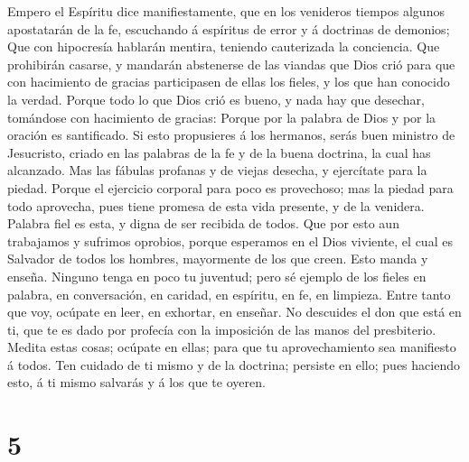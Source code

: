  Empero el Espíritu dice manifiestamente, que en los
venideros tiempos algunos apostatarán de la fe, escuchando á espíritus
de error y á doctrinas de demonios;  Que con hipocresía
hablarán mentira, teniendo cauterizada la conciencia.  Que
prohibirán casarse, y mandarán abstenerse de las viandas que Dios crió
para que con hacimiento de gracias participasen de ellas los fieles, y
los que han conocido la verdad.  Porque todo lo que Dios
crió es bueno, y nada hay que desechar, tomándose con hacimiento de
gracias:  Porque por la palabra de Dios y por la oración
es santificado.  Si esto propusieres á los hermanos, serás
buen ministro de Jesucristo, criado en las palabras de la fe y de la
buena doctrina, la cual has alcanzado.  Mas las fábulas
profanas y de viejas desecha, y ejercítate para la piedad.
 Porque el ejercicio corporal para poco es provechoso; mas
la piedad para todo aprovecha, pues tiene promesa de esta vida presente,
y de la venidera.  Palabra fiel es esta, y digna de ser
recibida de todos.  Que por esto aun trabajamos y
sufrimos oprobios, porque esperamos en el Dios viviente, el cual es
Salvador de todos los hombres, mayormente de los que creen.
 Esto manda y enseña.  Ninguno tenga en
poco tu juventud; pero sé ejemplo de los fieles en palabra, en
conversación, en caridad, en espíritu, en fe, en limpieza.
 Entre tanto que voy, ocúpate en leer, en exhortar, en
enseñar.  No descuides el don que está en ti, que te es
dado por profecía con la imposición de las manos del presbiterio.
 Medita estas cosas; ocúpate en ellas; para que tu
aprovechamiento sea manifiesto á todos.  Ten cuidado de
ti mismo y de la doctrina; persiste en ello; pues haciendo esto, á ti
mismo salvarás y á los que te oyeren.

\hypertarget{section-4}{%
\section{5}\label{section-4}}

